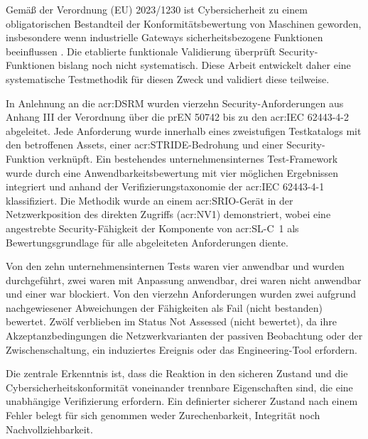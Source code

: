 Gemäß der Verordnung (EU) 2023/1230 ist Cybersicherheit zu einem obligatorischen Bestandteil der Konformitätsbewertung von Maschinen geworden, insbesondere wenn industrielle Gateways sicherheitsbezogene Funktionen beeinflussen \cite[S. 4]{EU2023_1230}. Die etablierte funktionale Validierung überprüft Security-Funktionen bislang noch nicht systematisch. Diese Arbeit entwickelt daher eine systematische Testmethodik für diesen Zweck und validiert diese teilweise.

In Anlehnung an die \gls{acr:DSRM} wurden vierzehn Security-Anforderungen aus Anhang III der Verordnung über die prEN 50742 bis zu den \acrshort{acr:IEC} 62443-4-2  abgeleitet. Jede Anforderung wurde innerhalb eines zweistufigen Testkatalogs mit den betroffenen Assets, einer \acrshort{acr:STRIDE}-Bedrohung und einer Security-Funktion verknüpft. Ein bestehendes unternehmensinternes Test-Framework wurde durch eine Anwendbarkeitsbewertung mit vier möglichen Ergebnissen integriert und anhand der Verifizierungstaxonomie der \acrshort{acr:IEC} 62443-4-1 klassifiziert. Die Methodik wurde an einem \gls{acr:SRIO}-Gerät in der Netzwerkposition des direkten Zugriffs (\acrshort{acr:NV1}) demonstriert, wobei eine angestrebte Security-Fähigkeit der Komponente von \acrshort{acr:SL-C}~1 als Bewertungsgrundlage für alle abgeleiteten Anforderungen diente.

Von den zehn unternehmensinternen Tests waren vier anwendbar und wurden durchgeführt, zwei waren mit Anpassung anwendbar, drei waren nicht anwendbar und einer war blockiert. Von den vierzehn Anforderungen wurden zwei aufgrund nachgewiesener Abweichungen der Fähigkeiten als Fail (nicht bestanden) bewertet. Zwölf verblieben im Status Not Assessed (nicht bewertet), da ihre Akzeptanzbedingungen die Netzwerkvarianten der passiven Beobachtung oder der Zwischenschaltung, ein induziertes Ereignis oder das Engineering-Tool erfordern.

Die zentrale Erkenntnis ist, dass die Reaktion in den sicheren Zustand und die Cybersicherheitskonformität voneinander trennbare Eigenschaften sind, die eine unabhängige Verifizierung erfordern. Ein definierter sicherer Zustand nach einem Fehler belegt für sich genommen weder Zurechenbarkeit, Integrität noch Nachvollziehbarkeit.

\clearpage